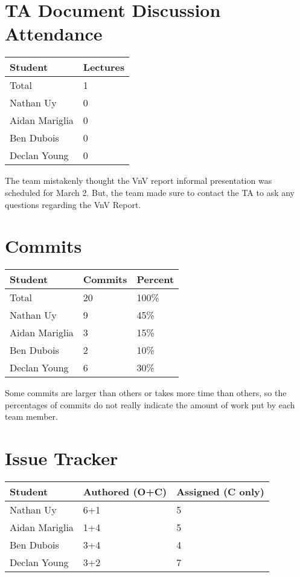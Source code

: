 \documentclass{article}
\begin{document}
\section{TA Document Discussion Attendance}

\begin{table}[H]
\centering
\begin{tabular}{ll}
\toprule
\textbf{Student} & \textbf{Lectures}\\
\midrule
Total & 1\\
Nathan Uy & 0\\
Aidan Mariglia & 0\\
Ben Dubois & 0\\
Declan Young & 0\\
\bottomrule
\end{tabular}
\end{table}

The team mistakenly thought the VnV report informal presentation was scheduled for March 2. But, the team made sure to contact the TA to ask any questions regarding the VnV Report.

\section{Commits}

\begin{table}[H]
\centering
\begin{tabular}{lll}
\toprule
\textbf{Student} & \textbf{Commits} & \textbf{Percent}\\
\midrule
Total & 20 & 100\% \\
Nathan Uy & 9 & 45\% \\
Aidan Mariglia & 3 & 15\% \\
Ben Dubois & 2 & 10\% \\
Declan Young & 6 & 30\% \\
\bottomrule
\end{tabular}
\end{table}

Some commits are larger than others or takes more time than others, so the percentages of commits do not really indicate the amount of work put by each team member.

\section{Issue Tracker}

\begin{table}[H]
\centering
\begin{tabular}{lll}
\toprule
\textbf{Student} & \textbf{Authored (O+C)} & \textbf{Assigned (C only)}\\
\midrule
Nathan Uy & 6+1 & 5 \\
Aidan Mariglia & 1+4 & 5 \\
Ben Dubois & 3+4 & 4 \\
Declan Young & 3+2 & 7 \\
\bottomrule
\end{tabular}
\end{table}
\end{document}
